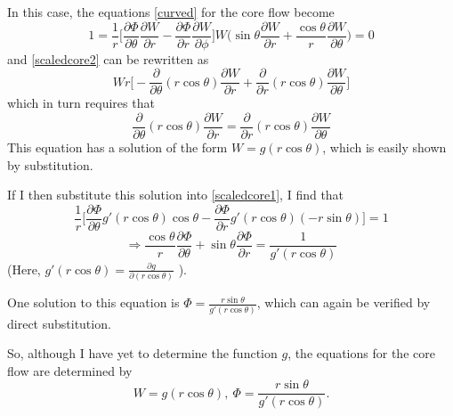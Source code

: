 \documentclass[10pt,a4paper]{report}
\begin{document}
In this case, the equations \eqref{curved} for the core flow become
\begin{subequations}
\begin{equation}\label{scaledcore1}
1 = \frac{1}{r} \bigg[\frac{\partial \Phi}{\partial \theta} \frac{\partial W}{\partial r} - \frac{\partial \Phi}{\partial r} \frac{\partial W}{\partial \phi} \bigg]
\end{equation}
\begin{equation}\label{scaledcore2}
W \bigg(\sin \theta \frac{\partial W}{\partial r} + \frac{\cos \theta}{r} \frac{\partial W}{\partial \theta} \bigg) = 0
\end{equation}
\end{subequations}
and \eqref{scaledcore2} can be rewritten as
\begin{equation*}
W r \bigg[-\frac{\partial}{\partial \theta} (r \cos \theta) \frac{\partial W}{\partial r} + \frac{\partial}{\partial r} (r \cos \theta) \frac{\partial W}{\partial \theta} \bigg]
\end{equation*}
which in turn requires that
\begin{equation*}
\frac{\partial}{\partial \theta} (r \cos \theta) \frac{\partial W}{\partial r} = \frac{\partial}{\partial r} (r \cos \theta ) \frac{\partial W}{\partial \theta}
\end{equation*}
This equation has a solution of the form $W = g(r \cos \theta)$, which is easily shown by substitution.

If I then substitute this solution into \eqref{scaledcore1}, I find that
\begin{equation*}
\frac{1}{r}\bigg[ \frac{\partial \Phi}{\partial \theta} g'(r \cos \theta) \cos \theta - \frac{\partial \Phi}{\partial r} g'(r \cos \theta) (-r \sin \theta) \bigg] = 1
\end{equation*}
\begin{equation*}
\Rightarrow \frac{\cos \theta}{r} \frac{\partial \Phi}{\partial \theta} + \sin \theta \frac{\partial \Phi}{\partial r} = \frac{1}{g'(r \cos \theta)}
\end{equation*}
(Here, $g'(r \cos \theta) = \frac{\partial g}{\partial (r \cos \theta)}$ ).

One solution to this equation is $\Phi = \frac{r \sin \theta}{g'(r \cos \theta)}$, which can again be verified by direct substitution.

So, although I have yet to determine the function $g$, the equations for the core flow are determined by
\begin{equation}\label{coreeqns}
W = g(r \cos \theta), \ \Phi = \frac{r \sin \theta}{g'(r \cos \theta)}.
\end{equation}
\end{document}
